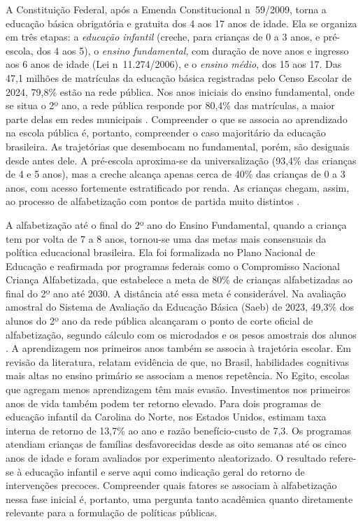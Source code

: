 A Constituição Federal, após a Emenda Constitucional
n\textordmasculine{}~59/2009, torna a educação básica obrigatória e
gratuita dos 4 aos 17 anos de idade. Ela se organiza em três etapas: a
\emph{educação infantil} (creche, para crianças de 0 a 3 anos, e
pré-escola, dos 4 aos 5), o \emph{ensino fundamental}, com duração de nove
anos e ingresso aos 6 anos de idade (Lei n\textordmasculine{}~11.274/2006),
e o \emph{ensino médio}, dos 15 aos 17. Das 47,1 milhões de matrículas da
educação básica registradas pelo Censo Escolar de 2024, 79,8\% estão na
rede pública. Nos anos iniciais do ensino fundamental, onde se situa o
2º ano, a rede pública responde por 80,4\% das matrículas, a maior parte
delas em redes municipais \cite{inep2025censo}. Compreender o que se
associa ao aprendizado na escola pública é, portanto, compreender o caso
majoritário da educação brasileira. As trajetórias que desembocam no
fundamental, porém, são desiguais desde antes dele. A pré-escola
aproxima-se da universalização (93,4\% das crianças de 4 e 5 anos), mas a
creche alcança apenas cerca de 40\% das crianças de 0 a 3 anos, com acesso
fortemente estratificado por renda. As crianças chegam, assim, ao processo
de alfabetização com pontos de partida muito distintos
\cite{ibge2025pnadeducacao}.

A alfabetização até o final do 2º ano do Ensino Fundamental, quando a
criança tem por volta de 7 a 8 anos, tornou-se uma das metas mais
consensuais da política educacional brasileira. Ela foi formalizada no
Plano Nacional de Educação e reafirmada por programas federais como o
Compromisso Nacional Criança Alfabetizada, que estabelece a meta de 80\% de
crianças alfabetizadas ao final do 2º ano até 2030. A distância até essa
meta é considerável. Na avaliação amostral do Sistema de Avaliação da
Educação Básica (Saeb) de 2023, 49,3\% dos alunos do 2º ano da rede
pública alcançaram o ponto de corte oficial de alfabetização, segundo
cálculo com os microdados e os pesos amostrais dos alunos
\cite{inep2026microdados}. A aprendizagem nos primeiros anos também se
associa à trajetória escolar. Em revisão da literatura,
 relatam evidência de que, no Brasil,
habilidades cognitivas mais altas no ensino primário se associam a menos
repetência. No Egito, escolas que agregam menos aprendizagem têm mais
evasão. Investimentos nos primeiros anos de vida também podem ter retorno
elevado. Para dois programas de educação infantil da Carolina do Norte,
nos Estados Unidos,  estimam taxa interna
de retorno de 13,7\% ao ano e razão benefício-custo de 7,3. Os programas
atendiam crianças de famílias desfavorecidas desde as oito semanas até os
cinco anos de idade e foram avaliados por experimento aleatorizado. O
resultado refere-se à educação infantil e serve aqui como indicação geral
do retorno de intervenções precoces. Compreender quais fatores se associam
à alfabetização nessa fase inicial é, portanto, uma pergunta tanto
acadêmica quanto diretamente relevante para a formulação de políticas
públicas.

